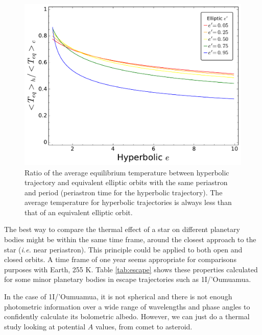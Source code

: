 \documentclass[a4paper,fleqn,usenatbib]{mnras}
\begin{document}
\begin{figure}
\includegraphics[width=\columnwidth]{f4.pdf}
\caption{Ratio of the average equilibrium temperature between hyperbolic trajectory and equivalent elliptic orbits with the same periastron and period (periastron time for the hyperbolic trajectory). The average temperature for hyperbolic trajectories is always less than that of an equivalent elliptic orbit.}
\label{fig4}
\end{figure}

The best way to compare the thermal effect of a star on different planetary bodies might be within the same time frame, around the closest approach to the star (\emph{i.e.} near periastron). This principle could be applied to both open and closed orbits. A time frame of one year seems appropriate for comparisons purposes with Earth, 255 K. Table \ref{tab:escape} shows these properties calculated for some minor planetary bodies in escape trajectories such as 1I/'Oumuamua.


In the case of 1I/'Oumuamua, it is not spherical and there is not enough photometric information over a wide range of wavelengths and phase angles to confidently calculate its bolometric albedo. However, we can just do a thermal study looking at potential $A$ values, from comet to asteroid.

\end{document}
